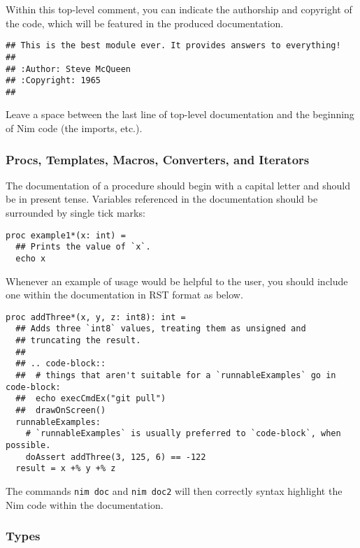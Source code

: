 Within this top-level comment, you can indicate the authorship and
copyright of the code, which will be featured in the produced
documentation.

\begin{verbatim}
## This is the best module ever. It provides answers to everything!
##
## :Author: Steve McQueen
## :Copyright: 1965
##
\end{verbatim}

Leave a space between the last line of top-level documentation and the
beginning of Nim code (the imports, etc.).

\hypertarget{procs-templates-macros-converters-and-iterators}{%
\subsubsection{Procs, Templates, Macros, Converters, and
Iterators}\label{procs-templates-macros-converters-and-iterators}}

The documentation of a procedure should begin with a capital letter and
should be in present tense. Variables referenced in the documentation
should be surrounded by single tick marks:

\begin{verbatim}
proc example1*(x: int) =
  ## Prints the value of `x`.
  echo x
\end{verbatim}

Whenever an example of usage would be helpful to the user, you should
include one within the documentation in RST format as below.

\begin{verbatim}
proc addThree*(x, y, z: int8): int =
  ## Adds three `int8` values, treating them as unsigned and
  ## truncating the result.
  ##
  ## .. code-block::
  ##  # things that aren't suitable for a `runnableExamples` go in code-block:
  ##  echo execCmdEx("git pull")
  ##  drawOnScreen()
  runnableExamples:
    # `runnableExamples` is usually preferred to `code-block`, when possible.
    doAssert addThree(3, 125, 6) == -122
  result = x +% y +% z
\end{verbatim}

The commands \texttt{nim\ doc} and \texttt{nim\ doc2} will then
correctly syntax highlight the Nim code within the documentation.

\hypertarget{types}{%
\subsubsection{Types}\label{types}}

